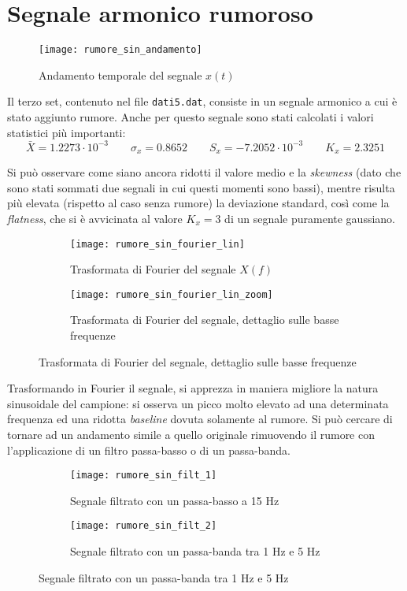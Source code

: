 \documentclass{article} %
\begin{document}
\section{Segnale armonico rumoroso}
\begin{figure}[h!]
	\centering
	\texttt{[image: rumore\_sin\_andamento]}
	\caption{Andamento temporale del segnale $x(t)$}
\end{figure}
Il terzo set, contenuto nel file \texttt{dati5.dat}, consiste in un segnale armonico a cui è stato aggiunto rumore. Anche per questo segnale sono stati calcolati i valori statistici più importanti:
$$ \bar{X} = 1.2273\cdot10^{-3} \qquad \sigma_{x} = 0.8652 \qquad S_{x} = -7.2052\cdot10^{-3} \qquad K_{x} =  2.3251 $$\par
Si può osservare come siano ancora ridotti il valore medio e la \textit{skewness} (dato che sono stati sommati due segnali in cui questi momenti sono bassi), mentre risulta più elevata (rispetto al caso senza rumore) la deviazione standard, così come la \textit{flatness}, che si è avvicinata al valore $K_x = 3$ di un segnale puramente gaussiano.\par
\begin{figure}[h!]
	\begin{subfigure}{0.5\textwidth}
		\texttt{[image: rumore\_sin\_fourier\_lin]}
		\caption{Trasformata di Fourier del segnale $X(f)$}
	\end{subfigure}
	\begin{subfigure}{0.5\textwidth}
		\texttt{[image: rumore\_sin\_fourier\_lin\_zoom]}
		\caption{Trasformata di Fourier del segnale, dettaglio sulle basse frequenze}
	\end{subfigure}
\end{figure}\par
Trasformando in Fourier il segnale, si apprezza in maniera migliore la natura sinusoidale del campione: si osserva un picco molto elevato ad una determinata frequenza ed una ridotta \textit{baseline} dovuta solamente al rumore. Si può cercare di tornare ad un andamento simile a quello originale rimuovendo il rumore con l'applicazione di un filtro passa-basso o di un passa-banda.\par
\begin{figure}[h!]
	\begin{subfigure}{0.5\textwidth}
		\texttt{[image: rumore\_sin\_filt\_1]}
		\caption{Segnale filtrato con un passa-basso a 15 Hz}
	\end{subfigure}
	\begin{subfigure}{0.5\textwidth}
		\texttt{[image: rumore\_sin\_filt\_2]}
		\caption{Segnale filtrato con un passa-banda tra 1 Hz e 5 Hz}
	\end{subfigure}
\end{figure}\par
\end{document}
